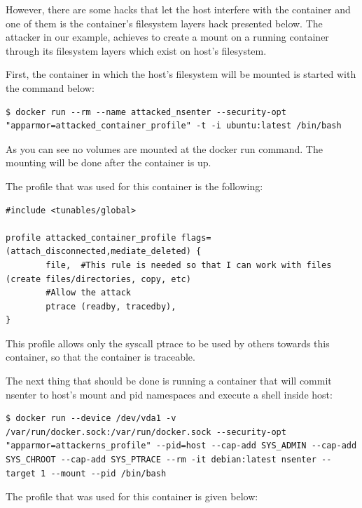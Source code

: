 However, there are some hacks that let the host interfere with the container and one of them is the container's filesystem layers hack presented below. The attacker in our example, achieves to create a mount on a running container through its filesystem layers which exist on host's filesystem.\cite{mountonrunning}

First, the container in which the host's filesystem will be mounted is started with the command below:

\begin{lstlisting}[style=dockercommands]
$ docker run --rm --name attacked_nsenter --security-opt "apparmor=attacked_container_profile" -t -i ubuntu:latest /bin/bash
\end{lstlisting}

As you can see no volumes are mounted at the docker run command. The mounting will be done after the container is up.

The profile that was used for this container is the following:

\begin{lstlisting}[style=Dockerfile, caption={AppArmor profile attacked\_container\_profile}]
#include <tunables/global>

profile attacked_container_profile flags=(attach_disconnected,mediate_deleted) {
        file,  #This rule is needed so that I can work with files (create files/directories, copy, etc)
        #Allow the attack
        ptrace (readby, tracedby),
}
\end{lstlisting}

This profile allows only the syscall ptrace to be used by others towards this container, so that the container is traceable.

The next thing that should be done is running a container that will commit nsenter to host's mount and pid namespaces and execute a shell inside host:

\begin{lstlisting}[style=dockercommands]
$ docker run --device /dev/vda1 -v /var/run/docker.sock:/var/run/docker.sock --security-opt "apparmor=attackerns_profile" --pid=host --cap-add SYS_ADMIN --cap-add SYS_CHROOT --cap-add SYS_PTRACE --rm -it debian:latest nsenter --target 1 --mount --pid /bin/bash
\end{lstlisting}

The profile that was used for this container is given below:

